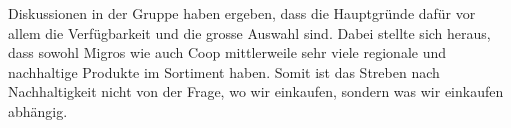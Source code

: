 Diskussionen in der Gruppe haben ergeben, dass die Hauptgründe dafür vor allem die Verfügbarkeit und
die grosse Auswahl sind. Dabei stellte sich heraus, dass sowohl Migros wie auch Coop mittlerweile
sehr viele regionale und nachhaltige Produkte im Sortiment haben. Somit ist  das Streben nach
Nachhaltigkeit nicht von der Frage, wo wir einkaufen, sondern was wir einkaufen abhängig.
